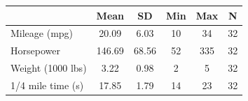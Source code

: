 \begin{tabular}{l*{5}{c}}
\doublerule
                &     Mean&       SD&      Min&      Max&        N\\
\midrule
Mileage (mpg)   &    20.09&     6.03&       10&       34&       32\\
Horsepower      &   146.69&    68.56&       52&      335&       32\\
Weight (1000 lbs)&     3.22&     0.98&        2&        5&       32\\
1/4 mile time (s)&    17.85&     1.79&       14&       23&       32\\
\midrule
\end{tabular}
